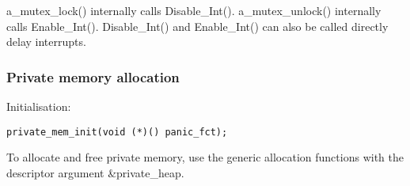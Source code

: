 a_mutex_lock() internally calls Disable_Int().
a_mutex_unlock() internally calls Enable_Int().
Disable_Int() and Enable_Int() can also be called directly
delay interrupts.


\subsubsection{Private memory allocation}

Initialisation:

\begin{verbatim}
private_mem_init(void (*)() panic_fct);
\end{verbatim}

To allocate and free private memory, use the generic allocation functions
with the descriptor argument \&private_heap.


